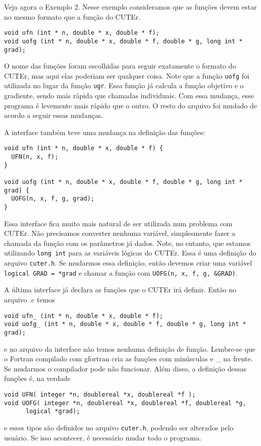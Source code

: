 \documentclass[letterpaper,11pt]{article}
\numberwithin{equation}{section}
\begin{document}
Veja agora o Exemplo 2. Nesse exemplo consideramos que as funções devem estar no mesmo
formato que a função do CUTEr.
\begin{verbatim}
void ufn (int * n, double * x, double * f);
void uofg (int * n, double * x, double * f, double * g, long int * grad);
\end{verbatim}
O nome das funções foram escolhidas para seguir exatamente o formato do CUTEr, mas aqui
elas poderiam ser qualquer coisa. Note que a função \verb+uofg+ foi utilizada no lugar
da função \verb+ugr+. Essa função já calcula a função objetivo e o gradiente, sendo mais
rápida que chamadas individuais. Com essa mudança, esse programa é levemente mais rápido
que o outro. O resto do arquivo foi mudado de acordo a seguir essas mudanças.

A interface também teve uma mudança na definição das funções:
\begin{verbatim}
void ufn (int * n, double * x, double * f) {
  UFN(n, x, f);
}

void uofg (int * n, double * x, double * f, double * g, long int * grad) {
  UOFG(n, x, f, g, grad);
}
\end{verbatim}
Essa interface fica muito mais natural de ser utilizada num problema com CUTEr. Não precisamos
converter nenhuma variável, simplesmente fazer a chamada da função com os parâmetros já dados.
Note, no entanto, que estamos utilizando \verb+long int+ para as variáveis lógicas do CUTEr.
Essa é uma definição do arquivo \verb+cuter.h+. Se mudarmos essa definição, então devemos
criar uma variável \verb+logical GRAD = *grad+ e chamar a função com
\verb+UOFG(n, x, f, g, &GRAD)+.

A última interface já declara as funções que o CUTEr irá definir. Então no arquivo .c temos
\begin{verbatim}
void ufn_ (int * n, double * x, double * f);
void uofg_ (int * n, double * x, double * f, double * g, long int * grad);
\end{verbatim}
e no arquivo da interface não temos nenhuma definição de função. Lembre-se que o Fortran
compilado com gfortran cria as funções com minúsculas e \_ na frente. Se mudarmos o
compilador pode não funcionar. 
Além disso, a definição dessas funções é, na verdade
\begin{verbatim}
void UFN( integer *n, doublereal *x, doublereal *f );
void UOFG( integer *n, doublereal *x, doublereal *f, doublereal *g,
      logical *grad);
\end{verbatim}
e esses tipos são definidos no arquivo \verb+cuter.h+, podendo ser alterados pelo usuário.
Se isso acontecer, é necessário mudar todo o programa.
\end{document}
